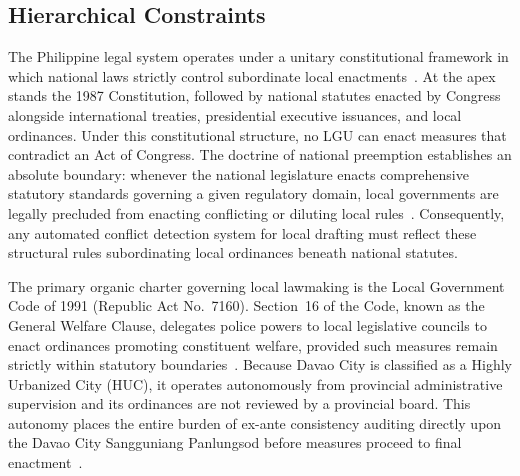     \subsection{Hierarchical Constraints}
    The Philippine legal system operates under a unitary constitutional framework in which national laws strictly control subordinate local enactments~\cite{philgov1991ra7160}. At the apex stands the 1987 Constitution, followed by national statutes enacted by Congress alongside international treaties, presidential executive issuances, and local ordinances. Under this constitutional structure, no LGU can enact measures that contradict an Act of Congress. The doctrine of national preemption establishes an absolute boundary: whenever the national legislature enacts comprehensive statutory standards governing a given regulatory domain, local governments are legally precluded from enacting conflicting or diluting local rules~\cite{philgov1991ra7160}. Consequently, any automated conflict detection system for local drafting must reflect these structural rules subordinating local ordinances beneath national statutes.

    The primary organic charter governing local lawmaking is the Local Government Code of 1991 (Republic Act No.~7160). Section~16 of the Code, known as the General Welfare Clause, delegates police powers to local legislative councils to enact ordinances promoting constituent welfare, provided such measures remain strictly within statutory boundaries~\cite{philgov1991ra7160}. Because Davao City is classified as a Highly Urbanized City (HUC), it operates autonomously from provincial administrative supervision and its ordinances are not reviewed by a provincial board. This autonomy places the entire burden of ex-ante consistency auditing directly upon the Davao City Sangguniang Panlungsod before measures proceed to final enactment~\cite{philgov1991ra7160}.

